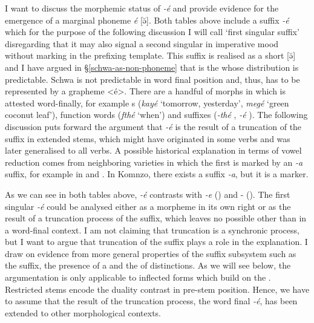 I want to discuss the morphemic status of \emph{-é} and provide evidence for the emergence of a marginal phoneme \emph{é} [ə̆]. Both tables above include a suffix \emph{-é} which for the purpose of the following discussion I will call `first  singular suffix' disregarding that it may also signal a second singular in imperative mood without  marking in the prefixing template. This suffix is realised as a short  [ə̆] and I have argued in \S{}\ref{schwa-as-non-phoneme} that  is the  whose distribution is predictable. Schwa is not predictable in word final position and, thus, has to be represented by a grapheme <é>. There are a handful of morphs in which  is attested word-finally, for example s (\emph{kayé} `tomorrow, yesterday', \emph{megé} `green coconut leaf'), function words (\emph{fthé} `when') and suffixes (\emph{-thé} \Adlzr{}, \emph{-é} \Fsg{}). The following discussion puts forward the argument that \emph{-é} is the result of a truncation of the  suffix in extended stems, which might have originated in some verbs and was later generalised to all verbs. A possible historical explanation in terms of vowel reduction comes from neighboring varieties in which the first  is marked by an \emph{-a} suffix, for example in  and . In Komnzo, there exists a suffix \emph{-a}, but it is a  marker.%

As we can see in both tables above, \emph{-é} contrasts with \emph{-e} (\Fnsg) and -\Zero{} (\Stsg). The first singular \emph{-é} could be analysed either as a morpheme in its own right or as the result of a truncation process of the  suffix, which leaves no possible  other than  in a word-final context. I am not claiming that truncation is a synchronic process, but I want to argue that truncation of the  suffix plays a role in the explanation. I draw on evidence from more general properties of the suffix subsystem such as the  suffix, the presence of a  and the  of  distinctions. As we will see below, the argumentation is only applicable to inflected forms which build on the . Restricted stems encode the duality contrast in pre-stem position. Hence, we have to assume that the result of the truncation process, the word final  \emph{-é}, has been extended to other morphological contexts.%

